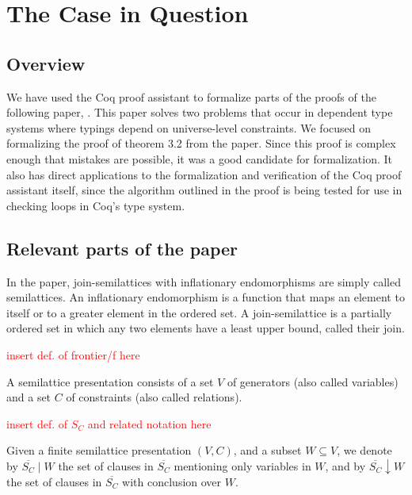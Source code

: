 \chapter{The Case in Question}

\section{Overview}

We have used the Coq proof assistant to formalize parts of the proofs of the following paper, \citeauthor{mbezem} \cite{mbezem}.
This paper solves two problems that occur in dependent type systems where typings depend
on universe-level constraints. We focused on formalizing the proof of theorem 3.2 from the paper.
Since this proof is complex enough that mistakes are possible, it was a good candidate for formalization.
It also has direct applications to the formalization and verification of the Coq proof assistant itself,
since the algorithm outlined in the proof is being tested
for use in checking loops in Coq's type system. \cite{coqgithub}

\section{Relevant parts of the paper}

In the paper, join-semilattices with inflationary endomorphisms
are simply called semilattices. An inflationary endomorphism is a function
that maps an element to itself or to a greater element in the ordered set.
A join-semilattice is a partially ordered set in which any two elements have a least upper bound,
called their join.

\textcolor{red}{insert def. of frontier/f here}

A semilattice presentation consists of a set $V$ of generators
(also called variables) and a set $C$ of constraints
(also called relations).

\textcolor{red}{insert def. of $S_C$ and related notation here}

Given a finite semilattice presentation $(V, C)$,
and a subset $W \subseteq V$, we denote by
$\overline{S_C} \mid W$ the set of clauses in $\overline{S_C}$
mentioning only variables in $W$, and by $\overline{S_C} \downarrow W$
the set of clauses in $\overline{S_C}$ with conclusion over $W$.


